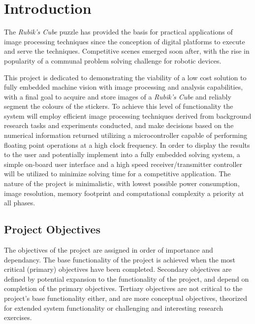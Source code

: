 \documentclass[11pt, a4paper, oneside]{Thesis} %
\begin{document}
\mainmatter %
\pagestyle{fancy} %




\chapter{Introduction}
\label{Introduction} %
The \emph{Rubik's Cube} puzzle has provided the basis for practical applications of image processing techniques since the conception of digital platforms to execute and serve the techniques. Competitive scenes emerged soon after, with the rise in popularity of a communal problem solving challenge for robotic devices.  

This project is dedicated to demonstrating the viability of a low cost solution to fully embedded machine vision with image processing and analysis capabilities, with a final goal to acquire and store images of a \emph{Rubik's Cube} and reliably segment the colours of the stickers. To achieve this level of functionality the system will employ efficient image processing techniques derived from background research tasks and experiments conducted, and make decisions based on the numerical information returned utilizing a microcontroller capable of performing floating point operations at a high clock frequency. In order to display the results to the user and potentially implement into a fully embedded solving system, a simple on-board user interface and a high speed receiver/transmitter controller will be utilized to minimize solving time for a competitive application. The nature of the project is minimalistic, with lowest possible power consumption, image resolution, memory footprint and computational complexity a priority at all phases. 

\section{Project Objectives}
The objectives of the project are assigned in order of importance and dependancy. The base functionality of the project is achieved when the most critical (primary) objectives have been completed. Secondary objectives are defined by potential expansion to the functionality of the project, and depend on completion of the primary objectives. Tertiary objectives are not critical to the project's base functionality either, and are more conceptual objectives, theorized for extended system functionality or challenging and interesting research exercises. 
\end{document}
